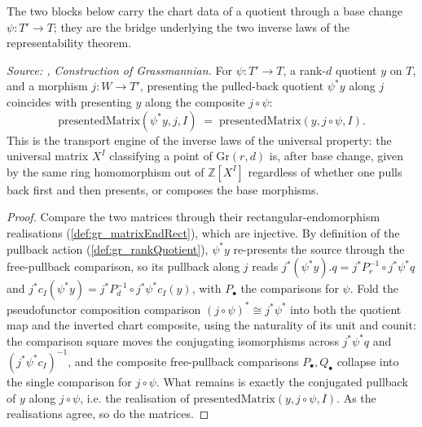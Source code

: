 The two blocks below carry the chart data of a quotient through a base change
\(\psi : T' \to T\); they are the bridge underlying the two inverse laws of the
representability theorem.

\begin{lemma}\leanok
  \label{lem:gr_presentedMatrix_rqPullback}
  \textit{Source: \cite{nitsure-hilbert-quot}, Construction of Grassmannian.}
  For \(\psi : T' \to T\), a rank-\(d\) quotient \(y\) on \(T\), and a morphism
  \(j : W \to T'\), presenting the pulled-back quotient \(\psi^{*}y\) along \(j\) coincides
  with presenting \(y\) along the composite \(j\circ\psi\):
  \[
    \mathrm{presentedMatrix}(\psi^{*}y, j, I)
      \;=\; \mathrm{presentedMatrix}(y, j\circ\psi, I).
  \]
  This is the transport engine of the inverse laws of the universal property: the universal
  matrix \(X^I\) classifying a point of \(\mathrm{Gr}(r,d)\) is, after base change, given by
  the same ring homomorphism out of \(\mathbb{Z}[X^I]\) regardless of whether one pulls back
  first and then presents, or composes the base morphisms.
\end{lemma}
\begin{proof}
  Compare the two matrices through their rectangular-endomorphism realisations
  (\cref{def:gr_matrixEndRect}), which are injective. By definition of the pullback action
  (\cref{def:gr_rankQuotient}), \(\psi^{*}y\) re-presents the source through the free-pullback
  comparison, so its pullback along \(j\) reads \(j^{*}(\psi^{*}y).q = j^{*}P_r^{-1}\circ
  j^{*}\psi^{*}q\) and \(j^{*}c_I(\psi^{*}y) = j^{*}P_d^{-1}\circ j^{*}\psi^{*}c_I(y)\), with
  \(P_\bullet\) the comparisons for \(\psi\). Fold the pseudofunctor composition comparison
  \((j\circ\psi)^{*}\cong j^{*}\psi^{*}\) into both the quotient map and the inverted chart
  composite, using the naturality of its unit and counit: the comparison square moves the
  conjugating isomorphisms across \(j^{*}\psi^{*}q\) and \((j^{*}\psi^{*}c_I)^{-1}\), and the
  composite free-pullback comparisons \(P_\bullet, Q_\bullet\) collapse into the single
  comparison for \(j\circ\psi\). What remains is exactly the conjugated pullback of \(y\)
  along \(j\circ\psi\), i.e. the realisation of \(\mathrm{presentedMatrix}(y, j\circ\psi, I)\).
  As the realisations agree, so do the matrices.
\end{proof}

